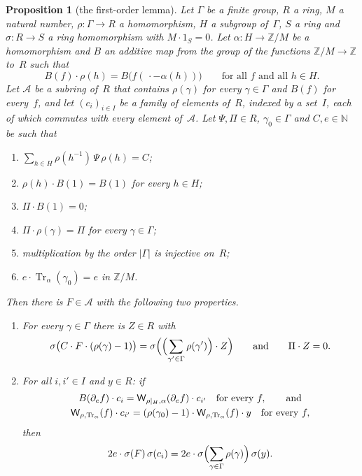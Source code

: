 \documentclass[11pt,a4paper]{article}
\newcommand{\m}[1]{\mbox{$#1$}}        %
\theoremstyle{plainx}
\newtheorem{proposition}[theorem]{Proposition}
\theoremstyle{uprightx}
\newcommand{\ZZ}{\mathbb{Z}}
\newcommand{\NN}{\mathbb{N}}
\newcommand{\Tr}{\operatorname{Tr}}
\newcommand{\cA}{\mathcal{A}}
\newcommand{\dif}[1]{\partial_{#1}}
\begin{document}
\begin{proposition}[the first-order lemma]\label{p:first}
Let $\Gamma$ be a finite group, $R$ a ring, $M$ a natural number, \m{\rho\colon\Gamma\to R} a homomorphism, $H$ a
subgroup of~$\Gamma$, $S$ a ring and \m{\sigma\colon R\to S} a ring homomorphism with \m{M\cdot1_S=0}. Let
\m{\alpha\colon H\to\ZZ/M} be a homomorphism and $B$ an additive map from the group of the functions
\m{\ZZ/M\to\ZZ} to~$R$ such that
\[B(f)\cdot\rho(h)=B\bigl(f(\,\cdot-\alpha(h))\bigr)\qquad\text{for all }f\text{ and all }h\in H.\]
Let $\cA$ be a subring of~$R$ that contains \m{\rho(\gamma)} for every \m{\gamma\in\Gamma} and \m{B(f)} for
every~$f$, and let \m{(c_i)_{i\in I}} be a family of elements of~$R$, indexed by a set~$I$, each of which commutes
with every element of~$\cA$. Let \m{\Psi,\Pi\in R}, \m{\gamma_0\in\Gamma} and \m{C,e\in\NN} be such that
\begin{enumerate}[label=\textup{(H\arabic*)},leftmargin=3em,itemsep=2pt]
\item \m{\sum_{h\in H}\rho(h^{-1})\,\Psi\,\rho(h)=C};
\item \m{\rho(h)\cdot B(1)=B(1)} for every \m{h\in H};
\item \m{\Pi\cdot B(1)=0};
\item \m{\Pi\cdot\rho(\gamma)=\Pi} for every \m{\gamma\in\Gamma};
\item multiplication by the order \m{|\Gamma|} is injective on~$R$;
\item \m{e\cdot\Tr_\alpha(\gamma_0)=e} in \m{\ZZ/M}.
\end{enumerate}
Then there is \m{F\in\cA} with the following two properties.
\begin{enumerate}[label=\textup{(\roman*)},leftmargin=2.3em,itemsep=2pt]
\item For every \m{\gamma\in\Gamma} there is \m{Z\in R} with
\[\sigma\bigl(C\cdot F\cdot(\rho(\gamma)-1)\bigr)=\sigma\Bigl(\Bigl(\sum_{\gamma'\in\Gamma}\rho(\gamma')\Bigr)\cdot
Z\Bigr)\qquad\text{and}\qquad\Pi\cdot Z=0.\]
\item For all \m{i,i'\in I} and \m{y\in R}: if
\begin{gather*}
B(\dif{e}f)\cdot c_i=\weightedSum{\rho|_H}{\alpha}{\dif{e}f}\cdot c_{i'}\quad\text{for every }f,\qquad\text{and}\\
\weightedSum{\rho}{\Tr_\alpha}{f}\cdot c_{i'}=(\rho(\gamma_0)-1)\cdot\weightedSum{\rho}{\Tr_\alpha}{f}\cdot y
\quad\text{for every }f,
\end{gather*}
then
\[2e\cdot\sigma(F)\,\sigma(c_i)=2e\cdot\sigma\Bigl(\sum_{\gamma\in\Gamma}\rho(\gamma)\Bigr)\,\sigma(y).\]
\end{enumerate}
\end{proposition}
\end{document}
